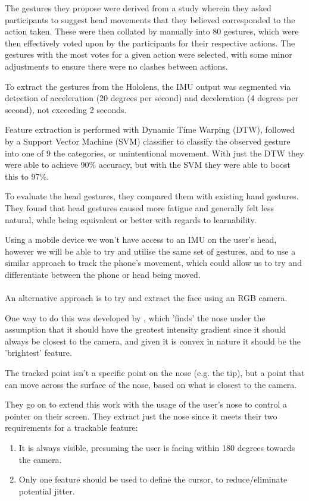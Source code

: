 The gestures they propose were derived from a study wherein they asked participants to suggest head movements that they believed corresponded to the action taken.
These were then collated by manually into 80 gestures, which were then effectively voted upon by the participants for their respective actions.
The gestures with the most votes for a given action were selected, with some minor adjustments to ensure there were no clashes between actions.

To extract the gestures from the Hololens, the IMU output was segmented via detection of acceleration (20 degrees per second) and deceleration (4 degrees per second), not exceeding 2 seconds.

Feature extraction is performed with Dynamic Time Warping (DTW)\cite{berndt1994using}, followed by a Support Vector Machine (SVM) classifier to classify the observed gesture into one of 9 the categories, or unintentional movement. With just the DTW they were able to achieve 90\% accuracy, but with the SVM they were able to boost this to 97\%.

To evaluate the head gestures, they compared them with existing hand gestures. They found that head gestures caused more fatigue and generally felt less natural, while being equivalent or better with regards to learnability.

Using a mobile device we won't have access to an IMU on the user's head, however we will be able to try and utilise the same set of gestures, and to use a similar approach to track the phone's movement, which could allow us to try and differentiate between the phone or head being moved.
\\\\
An alternative approach is to try and extract the face using an RGB camera.

One way to do this was developed by \citeauthor{gorodnichy2002importance}, which 'finds' the nose under the assumption that it should have the greatest intensity gradient since it should always be closest to the camera, and given it is convex in nature it should be the 'brightest' feature\cite{gorodnichy2002importance}.

The tracked point isn't a specific point on the nose (e.g. the tip), but a point that can move across the surface of the nose, based on what is closest to the camera.

They go on to extend this work with the usage of the user's nose to control a pointer on their screen\cite{gorodnichy2004nouse}. 
They extract just the nose since it meets their two requirements for a trackable feature: \begin{enumerate}
    \item It is always visible, presuming the user is facing within 180 degrees towards the camera.
    \item Only one feature should be used to define the cursor, to reduce/eliminate potential jitter.
\end{enumerate}

